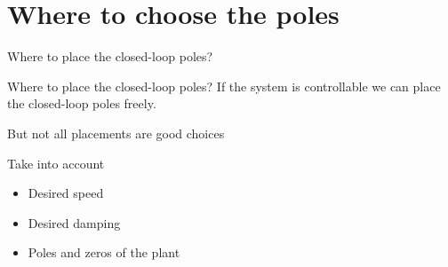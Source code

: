 \documentclass[presentation,aspectratio=1610]{beamer}
\begin{document}
\section{Where to choose the poles}
\label{sec:org5d05aaa}
\begin{frame}[label={sec:org93e0678}]{Where to place the closed-loop poles?}
\end{frame}
\begin{frame}[label={sec:org0ab5382}]{Where to place the closed-loop poles?}
If the system is controllable we can place the closed-loop poles freely.

\pause

But not all placements are good choices

\pause

Take into account
\begin{itemize}
\item Desired speed
\item Desired damping
\item \alert{Poles and zeros of the plant}
\end{itemize}
\end{frame}
\end{document}
